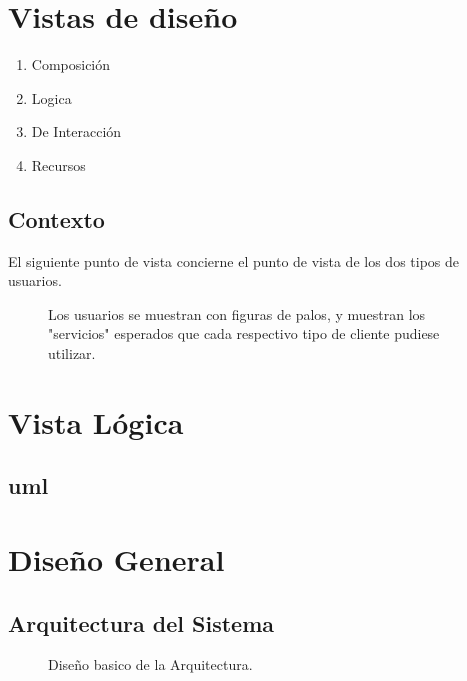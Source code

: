 \documentclass{article}
\begin{document}
  \section{Vistas de dise\~no}

  \begin{enumerate}
      \item Composici\'on 
      \item Logica
      \item De Interacci\'on
      \item Recursos
  \end{enumerate}


\subsection{Contexto}
  El siguiente punto de vista concierne el punto de vista de los dos tipos de usuarios.

  \begin{figure}[!htb]
    \begin{center}
      
    \end{center}
    \caption{Los usuarios se muestran con figuras de palos, y muestran los "servicios" esperados que cada respectivo tipo de cliente pudiese utilizar.}\label{fig:}
  \end{figure}
  

\section{Vista L\'ogica}
\subsection{uml}

\begin{figure}[!htb]
  \begin{center}
    
  \end{center}
  \caption{}\label{fig:}
\end{figure}


\section{Dise\~no General}
  
  \subsection{Arquitectura del Sistema}
  \begin{figure}
    \begin{center}
      
    \end{center}
    \caption{}\label{fig: Arquitectura Basica}
  Dise\~no basico de la Arquitectura.
  \end{figure}
\end{document}
